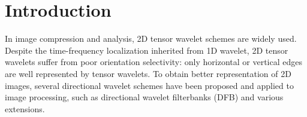 \section{Introduction}

\iffalse
\begin{itemize}
\item review construction of directional wavelet, shearlet
\item what's new in our construction?
\item summary: framework, technique, reference(Durand, Cohen)
\item organization of the paper
\end{itemize}
\fi

In image compression and analysis, 2D tensor wavelet schemes are widely used. Despite the time-frequency localization inherited from 1D wavelet, 2D tensor wavelets suffer from poor orientation selectivity: only horizontal or vertical edges are well represented by tensor wavelets. To obtain better representation of 2D images, several directional wavelet schemes have been proposed and applied to image processing, such as directional wavelet filterbanks (DFB) and various extensions.

